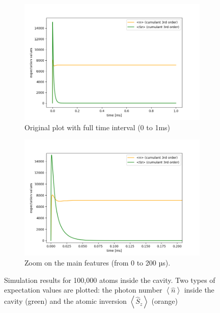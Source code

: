 \documentclass[11pt]{report}
\begin{document}
\begin{figure}[h!]
\centering
\begin{subfigure}{.48\textwidth}
  \centering
  \includegraphics[width=1\linewidth]{100k_3_nsz}
  \caption{Original plot with full time interval (0 to 1ms)}
\end{subfigure}%
\hspace{1em}%
\begin{subfigure}{.48\textwidth}
  \centering
  \includegraphics[width=1\linewidth]{100k_3_nsz_zoom_1}
  \caption{Zoom on the main features (from 0 to 200 µs).}
  \label{100k_3_nsz_zoom_1}
\end{subfigure}
\caption{Simulation results for 100,000 atoms inside the cavity. Two types of expectation values are plotted: the photon number $\left\langle \hat{n} \right\rangle$ inside the cavity (green) and the atomic inversion $\left\langle  \hat{S}_z \right\rangle$ (orange)}
\end{figure}
\end{document}
